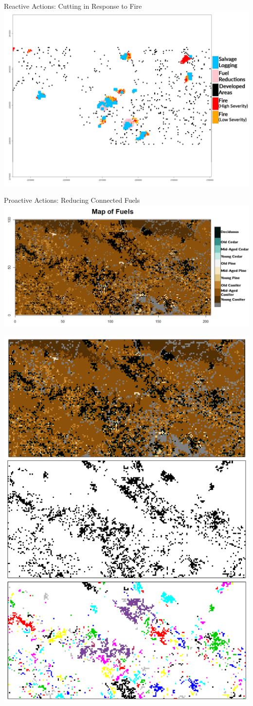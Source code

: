 \documentclass[xcolor=dvipsnames]{beamer}
\begin{document}
\begin{frame}{Reactive Actions: Cutting in Response to Fire}
\centering\includegraphics[width=.9\linewidth]{developAreaMapwithFireAndThinningAndSalvage.png}
\end{frame}

\begin{frame}{Proactive Actions: Reducing Connected Fuels}
\centering\includegraphics[width=\linewidth]{mapOfFuelFinallabel.png}
\end{frame}

\begin{frame}{}
\centering\includegraphics[width=.49\linewidth]{fuelMapTOConnectCompsFOREXAMPLE.png}
\end{frame}
\end{document}
